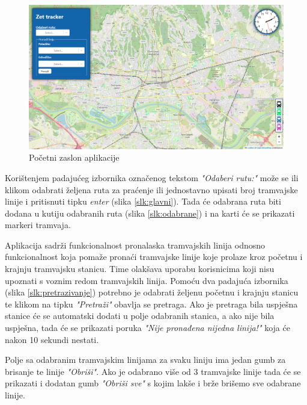 \documentclass[zavrsnirad]{fer}
\begin{document}
\begin{figure}[H]
	\centering
	\includegraphics[width=\linewidth]{Figures/default.png} 
	\caption{Početni zaslon aplikacije}
	\label{slk:default}
\end{figure}
\newpage
Korištenjem padajućeg izbornika označenog tekstom \textit{"Odaberi rutu:"} može se ili klikom odabrati željena ruta za praćenje ili jednostavno upisati broj tramvajske linije i pritisnuti tipku \textit{enter} (slika \ref{slk:glavni}). Tada će odabrana ruta biti dodana u kutiju odabranih ruta (slika \ref{slk:odabrane}) i na karti će se prikazati markeri tramvaja.

Aplikacija sadrži funkcionalnost pronalaska tramvajskih linija odnosno funkcionalnost koja pomaže pronaći tramvajske linije koje prolaze kroz početnu i krajnju tramvajsku stanicu. Time olakšava uporabu korisnicima koji nisu upoznati s voznim redom tramvajskih linija. Pomoću dva padajuća izbornika (slika \ref{slk:pretrazivanje}) potrebno je odabrati željenu početnu i krajnju stanicu te klikom na tipku \textit{"Pretraži"} obavlja se pretraga. Ako je pretraga bila uspješna stanice će se automatski dodati u polje odabranih stanica, a ako nije bila uspješna, tada će se prikazati poruka \textit{"Nije pronađena nijedna linija!"} koja će nakon 10 sekundi nestati.

Polje sa odabranim tramvajskim linijama za svaku liniju ima jedan gumb za brisanje te linije \textit{"Obriši"}. Ako je odabrano više od 3 tramvajske linije tada će se prikazati i dodatan gumb \textit{"Obriši sve"} s kojim lakše i brže brišemo sve odabrane linije.\\
\end{document}
